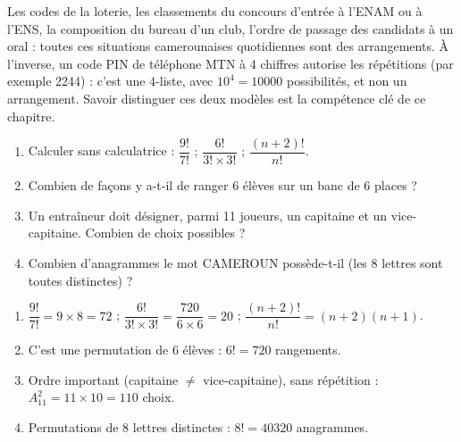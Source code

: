 \documentclass[11pt]{article}
\begin{document}
\begin{savaistu}
Les codes de la loterie, les classements du concours d'entrée à l'ENAM ou à l'ENS, la composition du bureau d'un club, l'ordre de passage des candidats à un oral : toutes ces situations camerounaises quotidiennes sont des arrangements. À l'inverse, un code PIN de téléphone MTN à 4 chiffres autorise les répétitions (par exemple 2244) : c'est une $4$-liste, avec $10^4 = \num{10000}$ possibilités, et non un arrangement. Savoir distinguer ces deux modèles est la compétence clé de ce chapitre.
\end{savaistu}

\begin{exercice}
\begin{enumerate}
\item Calculer sans calculatrice : $\dfrac{9!}{7!}$ ; $\dfrac{6!}{3!\times 3!}$ ; $\dfrac{(n+2)!}{n!}$.
\item Combien de façons y a-t-il de ranger 6 élèves sur un banc de 6 places ?
\item Un entraîneur doit désigner, parmi 11 joueurs, un capitaine et un vice-capitaine. Combien de choix possibles ?
\item Combien d'anagrammes le mot CAMEROUN possède-t-il (les 8 lettres sont toutes distinctes) ?
\end{enumerate}
\end{exercice}

\begin{corrige}[Exercice 3]
\begin{enumerate}
\item $\dfrac{9!}{7!} = 9\times 8 = 72$ ; \quad $\dfrac{6!}{3!\times 3!} = \dfrac{720}{6\times 6} = 20$ ; \quad $\dfrac{(n+2)!}{n!} = (n+2)(n+1)$.
\item C'est une permutation de 6 élèves : $6! = 720$ rangements.
\item Ordre important (capitaine $\neq$ vice-capitaine), sans répétition : $A_{11}^2 = 11\times 10 = 110$ choix.
\item Permutations de 8 lettres distinctes : $8! = \num{40320}$ anagrammes.
\end{enumerate}
\end{corrige}
\end{document}
